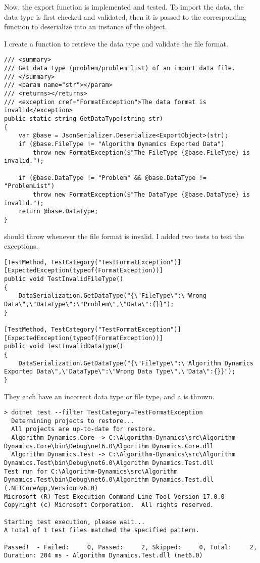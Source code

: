 \documentclass[report.tex]{subfiles}
\begin{document}
Now, the export function is implemented and tested. To import the data, the data type is first checked and validated, then it is passed to the corresponding function to deserialize into an instance of the object.

I create a  function to retrieve the data type and validate the file format.

\begin{verbatim}
/// <summary>
/// Get data type (problem/problem list) of an import data file.
/// </summary>
/// <param name="str"></param>
/// <returns></returns>
/// <exception cref="FormatException">The data format is invalid</exception>
public static string GetDataType(string str)
{
    var @base = JsonSerializer.Deserialize<ExportObject>(str);
    if (@base.FileType != "Algorithm Dynamics Exported Data")
        throw new FormatException($"The FileType {@base.FileType} is invalid.");

    if (@base.DataType != "Problem" && @base.DataType != "ProblemList")
        throw new FormatException($"The DataType {@base.DataType} is invalid.");
    return @base.DataType;
}
\end{verbatim}

 should throw  whenever the file format is invalid. I added two tests to test the exceptions.

\begin{verbatim}
[TestMethod, TestCategory("TestFormatException")]
[ExpectedException(typeof(FormatException))]
public void TestInvalidFileType()
{
    DataSerialization.GetDataType("{\"FileType\":\"Wrong Data\",\"DataType\":\"Problem\",\"Data\":{}}");
}

[TestMethod, TestCategory("TestFormatException")]
[ExpectedException(typeof(FormatException))]
public void TestInvalidDataType()
{
    DataSerialization.GetDataType("{\"FileType\":\"Algorithm Dynamics Exported Data\",\"DataType\":\"Wrong Data Type\",\"Data\":{}}");
}
\end{verbatim}

They each have an incorrect data type or file type, and a  is thrown.

\begin{verbatim}
> dotnet test --filter TestCategory=TestFormatException
  Determining projects to restore...
  All projects are up-to-date for restore.
  Algorithm Dynamics.Core -> C:\Algorithm-Dynamics\src\Algorithm Dynamics.Core\bin\Debug\net6.0\Algorithm Dynamics.Core.dll
  Algorithm Dynamics.Test -> C:\Algorithm-Dynamics\src\Algorithm Dynamics.Test\bin\Debug\net6.0\Algorithm Dynamics.Test.dll
Test run for C:\Algorithm-Dynamics\src\Algorithm Dynamics.Test\bin\Debug\net6.0\Algorithm Dynamics.Test.dll (.NETCoreApp,Version=v6.0)
Microsoft (R) Test Execution Command Line Tool Version 17.0.0
Copyright (c) Microsoft Corporation.  All rights reserved.

Starting test execution, please wait...
A total of 1 test files matched the specified pattern.

Passed!  - Failed:     0, Passed:     2, Skipped:     0, Total:     2, Duration: 204 ms - Algorithm Dynamics.Test.dll (net6.0)
\end{verbatim}
\end{document}
